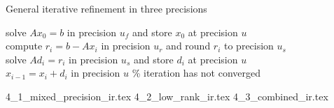 \begin{algorithm}[h]
  \caption{General iterative refinement in three precisions}
  \label{alg:iterative_refinement}
  \SetAlgoLined
  solve $Ax_0=b$ in precision $u_f$ and store $x_0$ at precision $u$ \\
   {
    compute $r_i = b-Ax_i$ in precision $u_r$ and round $r_i$ to precision $u_s$ \\
    solve $Ad_i=r_i$ in precision $u_s$ and store $d_i$ at precision $u$ \\
    $x_{i-1}=x_i+d_i$ in precision $u$}
  \% iteration has not converged
\end{algorithm}

{4_1_mixed_precision_ir.tex}
{4_2_low_rank_ir.tex}
{4_3_combined_ir.tex}